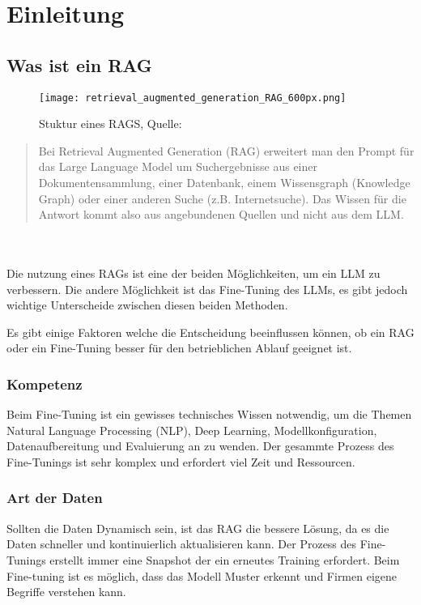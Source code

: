 \chapter{Einleitung}

\section{Was ist ein RAG}

\begin{figure}[h!]
    \centering
    \texttt{[image: retrieval\_augmented\_generation\_RAG\_600px.png]}
    \caption{Stuktur eines RAGS, Quelle: \cite{honroth2024retrieval}}
    \label{fig:Rag Structure}
\end{figure}

\begin{quote}
    Bei Retrieval Augmented Generation (RAG) erweitert man den Prompt für das Large Language Model um Suchergebnisse aus einer Dokumentensammlung, einer Datenbank, einem Wissensgraph (Knowledge Graph) oder einer anderen Suche (z.B. Internetsuche). Das Wissen für die Antwort kommt also aus angebundenen Quellen und nicht aus dem LLM.
\end{quote}
\cite{honroth2024retrieval}\\ \\

Die nutzung eines RAGs ist eine der beiden Möglichkeiten, um ein LLM zu verbessern. Die andere Möglichkeit ist das Fine-Tuning des LLMs, es gibt jedoch wichtige Unterscheide zwischen diesen beiden Methoden.

Es gibt einige Faktoren welche die Entscheidung beeinflussen können, ob ein RAG oder ein Fine-Tuning besser für den betrieblichen Ablauf geeignet ist.

\subsection{Kompetenz}
Beim Fine-Tuning ist ein gewisses technisches Wissen notwendig, um die Themen Natural Language Processing (NLP), Deep Learning, Modellkonfiguration, Datenaufbereitung und Evaluierung an zu wenden.
Der gesammte Prozess des Fine-Tunings ist sehr komplex und erfordert viel Zeit und Ressourcen.

\subsection{Art der Daten}
Sollten die Daten Dynamisch sein, ist das RAG die bessere Lösung, da es die Daten schneller und kontinuierlich aktualisieren kann.
Der Prozess des Fine-Tunings erstellt immer eine Snapshot der ein erneutes Training erfordert.
Beim Fine-tuning ist es möglich, dass das Modell Muster erkennt und Firmen eigene Begriffe verstehen kann.

